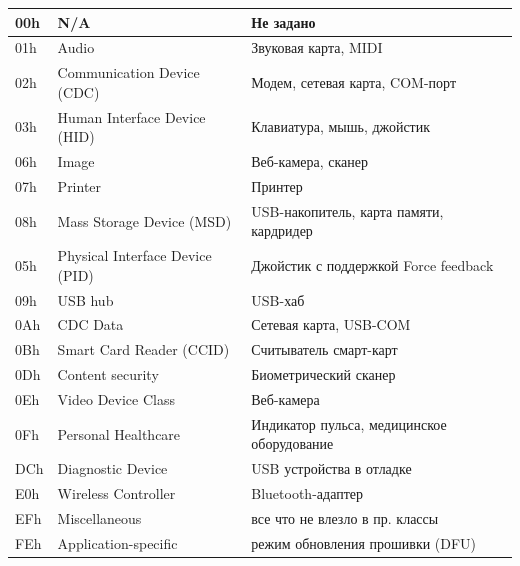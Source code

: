\documentclass[12pt,a4paper]{article}
\begin{document}
\begin{center}
  \begin{tabular}{ | l | l | l | }
    \hline
    00h &	N/A &	Не задано \\ \hline
    01h &	Audio &	Звуковая карта, MIDI \\ \hline
    02h &	Communication Device (CDC)  &	Модем, сетевая карта, COM-порт \\ \hline
    03h &	Human Interface Device (HID) &	Клавиатура, мышь, джойстик \\ \hline
    06h &	Image &	Веб-камера, сканер \\ \hline
    07h &	Printer &	Принтер \\ \hline
    08h &	Mass Storage Device (MSD) &	USB-накопитель, карта памяти, кардридер \\ \hline
    05h &	Physical Interface Device (PID) &	Джойстик с поддержкой Force feedback \\ \hline
    09h &	USB hub &	USB-хаб \\ \hline
    0Ah &	CDC Data &	Сетевая карта, USB-COM \\ \hline
    0Bh &	Smart Card Reader (CCID) &	Считыватель смарт-карт \\ \hline
    0Dh &	Content security &	Биометрический сканер \\ \hline
    0Eh &	Video Device Class &	Веб-камера \\ \hline
    0Fh &	Personal Healthcare &	Индикатор пульса, медицинское оборудование \\ \hline
    DCh &	Diagnostic Device &	USB устройства в отладке \\ \hline
    E0h &	Wireless Controller &	Bluetooth-адаптер \\ \hline
    EFh &	Miscellaneous &	все что не влезло в пр. классы \\ \hline
    FEh &	Application-specific &	режим обновления прошивки (DFU) \\ \hline
  \end{tabular}
\end{center}
\end{document}
